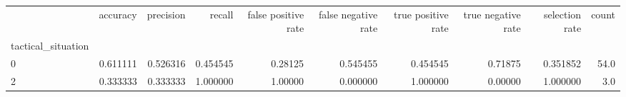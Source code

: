 \begin{tabular}{lrrrrrrrrr}
\toprule
{} &  accuracy &  precision &    recall &  false positive rate &  false negative rate &  true positive rate &  true negative rate &  selection rate &  count \\
tactical\_situation &           &            &           &                      &                      &                     &                     &                 &        \\
\midrule
0                  &  0.611111 &   0.526316 &  0.454545 &              0.28125 &             0.545455 &            0.454545 &             0.71875 &        0.351852 &   54.0 \\
2                  &  0.333333 &   0.333333 &  1.000000 &              1.00000 &             0.000000 &            1.000000 &             0.00000 &        1.000000 &    3.0 \\
\bottomrule
\end{tabular}
